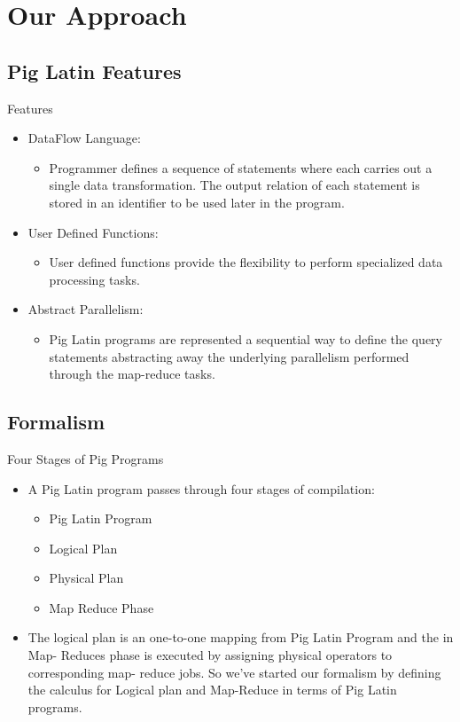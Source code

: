 \section{Our Approach}

\subsection{Pig Latin Features}
\begin{frame}{Features}
\begin{itemize}
	\item DataFlow Language: 
	\begin{itemize}
		\item Programmer defines a sequence of statements where each carries out a single 					  data transformation. The output relation of each statement is stored in an  					  identifier to be used later in the program.
	\end{itemize}
	\item User Defined Functions:
	\begin{itemize}
		\item User defined functions provide the flexibility to perform specialized data 				 	  processing tasks.
	\end{itemize}
	\item Abstract Parallelism:
	\begin{itemize}
		\item Pig Latin programs are represented a sequential way to define the query 					      statements abstracting away the underlying parallelism performed through the 					  map-reduce tasks.
	\end{itemize}
\end{itemize}
\end{frame}

\subsection{Formalism}
\begin{frame}{Four Stages of Pig Programs}
\begin{itemize}
	\item A Pig Latin program passes through four stages of compilation:
	\begin{itemize}
		\item Pig Latin Program
		\item Logical Plan
		\item Physical Plan
		\item Map Reduce Phase
	\end{itemize}
	\item The logical plan is an one-to-one mapping from Pig Latin Program and the in Map-				  Reduces phase is executed by assigning physical operators to corresponding map-				  reduce jobs. So we've started our formalism by defining the calculus for Logical 				  plan and Map-Reduce in terms of Pig Latin programs.
\end{itemize}
\end{frame}

